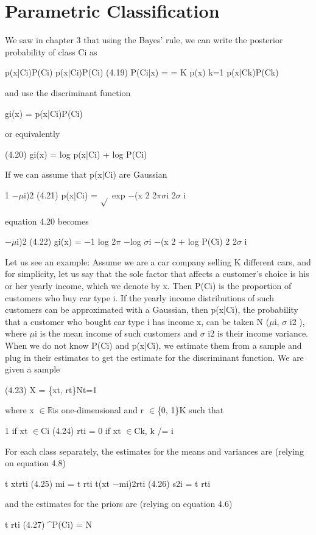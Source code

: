 \section{Parametric Classification}

We saw in chapter 3 that using the Bayes’ rule, we can write the posterior probability of class Ci as

p(x|Ci)P(Ci) p(x|Ci)P(Ci) (4.19) P(Ci|x) = = K p(x) k=1 p(x|Ck)P(Ck)

and use the discriminant function

gi(x) = p(x|Ci)P(Ci)

or equivalently

(4.20) gi(x) = log p(x|Ci) + log P(Ci)

If we can assume that p(x|Ci) are Gaussian

1 $-$$\mu$i)2 (4.21) p(x|Ci) = $\sqrt{}$ exp $-$(x 2 2$\pi$$\sigma$i 2$\sigma$ i

equation 4.20 becomes

$-$$\mu$i)2 (4.22) gi(x) = $-$1 log 2$\pi$ $-$log $\sigma$i $-$(x 2 + log P(Ci) 2 2$\sigma$ i

Let us see an example: Assume we are a car company selling K different cars, and for simplicity, let us say that the sole factor that affects a customer’s choice is his or her yearly income, which we denote by x. Then P(Ci) is the proportion of customers who buy car type i. If the yearly income distributions of such customers can be approximated with a Gaussian, then p(x|Ci), the probability that a customer who bought car type i has income x, can be taken N ($\mu$i, $\sigma$ i2 ), where $\mu$i is the mean income of such customers and $\sigma$ i2 is their income variance. When we do not know P(Ci) and p(x|Ci), we estimate them from a sample and plug in their estimates to get the estimate for the discriminant function. We are given a sample

(4.23) X = \{xt, rt\}Nt=1

where x $\in$$\mathbb{R}$is one-dimensional and r $\in$\{0, 1\}K such that

1 if xt $\in$Ci (4.24) rti = 0 if xt $\in$Ck, k /= i

For each class separately, the estimates for the means and variances are (relying on equation 4.8)

t xtrti (4.25) mi = t rti t(xt $-$mi)2rti (4.26) s2i = t rti

and the estimates for the priors are (relying on equation 4.6)

t rti (4.27) \textasciicircum{}P(Ci) = N

